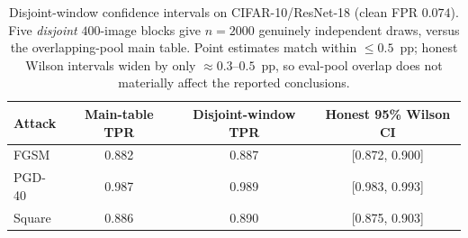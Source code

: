 \begin{table}[H]
\centering
\small
\begin{tabular}{lccc}
\toprule
Attack & Main-table TPR & Disjoint-window TPR & Honest 95\% Wilson CI \\
\midrule
FGSM   & 0.882 & 0.887 & [0.872, 0.900] \\
PGD-40 & 0.987 & 0.989 & [0.983, 0.993] \\
Square & 0.886 & 0.890 & [0.875, 0.903] \\
\bottomrule
\end{tabular}
\caption{Disjoint-window confidence intervals on CIFAR-10/ResNet-18 (clean FPR
$0.074$). Five \emph{disjoint} $400$-image blocks give $n{=}2000$ genuinely
independent draws, versus the overlapping-pool main table. Point estimates
match within $\le 0.5$~pp; honest Wilson intervals widen by only $\approx
0.3$--$0.5$~pp, so eval-pool overlap does not materially affect the reported
conclusions.}
\label{tab:disjoint_ci}
\end{table}
